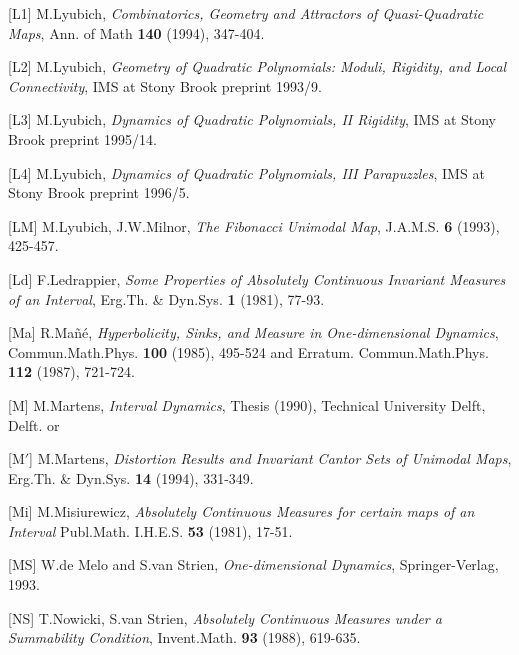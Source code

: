 \item{[L1]} M.Lyubich, {\it Combinatorics, Geometry and Attractors of
            Quasi-Quadratic Maps}, Ann. of Math {\bf 140} (1994), 347-404.

\item{[L2]} M.Lyubich, {\it Geometry of Quadratic Polynomials: Moduli,
            Rigidity, and Local Connectivity},
            IMS at Stony Brook preprint 1993/9. 

\item{[L3]} M.Lyubich, {\it Dynamics of Quadratic Polynomials, II 
            Rigidity}, IMS at Stony Brook preprint 1995/14. 

\item{[L4]} M.Lyubich, {\it Dynamics of Quadratic Polynomials, III 
            Parapuzzles}, IMS at Stony Brook preprint 1996/5.

\item{[LM]} M.Lyubich, J.W.Milnor, {\it The Fibonacci Unimodal Map},
            J.A.M.S. {\bf 6} (1993), 425-457.

\item{[Ld]} F.Ledrappier, {\it Some Properties of Absolutely Continuous
            Invariant Measures of an Interval}, Erg.Th. \& Dyn.Sys. 
            {\bf 1} (1981), 77-93. 

\item{[Ma]} R.Ma\~n\'e, {\it Hyperbolicity, Sinks, and Measure in 
            One-dimensional Dynamics}, Commun.Math.Phys. {\bf 100} (1985), 
            495-524 and Erratum. Commun.Math.Phys. {\bf 112} (1987), 721-724. 

\item{[M]} M.Martens, {\it Interval Dynamics}, Thesis (1990), 
            Technical University Delft, Delft. or
 
\item{[M$'$]} M.Martens, {\it Distortion Results and Invariant Cantor Sets of
           Unimodal Maps}, Erg.Th. \& Dyn.Sys. {\bf 14} (1994), 331-349.

\item{[Mi]} M.Misiurewicz, {\it Absolutely Continuous Measures for certain
            maps of an Interval}  Publ.Math. I.H.E.S. {\bf 53} (1981),
            17-51.
 
\item{[MS]} W.de Melo and S.van Strien, {\it One-dimensional Dynamics},
           Springer-Verlag, 1993.

\item{[NS]} T.Nowicki, S.van Strien, {\it Absolutely Continuous Measures under
           a Summability Condition}, Invent.Math. {\bf 93} (1988), 619-635.

